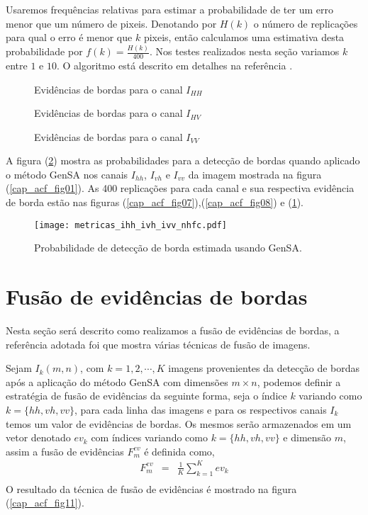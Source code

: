 Usaremos frequências relativas para estimar a probabilidade de ter um erro menor que um número de pixeis. Denotando por $H(k)$ o número de replicações para qual o erro é menor que $k$ pixeis, então calculamos uma estimativa desta probabilidade por $f(k)=\frac{H(k)}{400}$. Nos testes realizados nesta seção variamos $k$ entre $1$ e $10$. O algoritmo está descrito em detalhes na referência \citep{fbgm}. 
\begin{figure}[hbt]
\caption{Evidências de bordas para o canal $I_{HH}$}\label{cap_acf_fig07}
\endminipage\hfill
{}
\caption{Evidências de bordas para o canal $I_{HV}$}\label{cap_acf_fig08}
\endminipage\hfill
\centering
{}
\caption{Evidências de bordas para o canal $I_{VV}$}\label{cap_acf_fig09}
\endminipage\hfill
\end{figure}

	A figura (\ref{cap_acf_fig10}) mostra as probabilidades para a detecção de bordas quando aplicado o método GenSA nos canais $I_{hh}$, $I_{vh}$ e $I_{vv}$ da imagem mostrada na figura (\ref{cap_acf_fig01}). As 400 replicações para cada canal e sua respectiva evidência de borda estão nas figuras (\ref{cap_acf_fig07}),(\ref{cap_acf_fig08}) e (\ref{cap_acf_fig09}).  
\begin{figure}[hbt]
\centering
	\texttt{[image: metricas\_ihh\_ivh\_ivv\_nhfc.pdf]}
	\caption{Probabilidade de detecção de borda estimada usando GenSA.}
\label{cap_acf_fig10}
\end{figure}

\section{Fusão de evidências de bordas}

	Nesta seção será descrito como realizamos a fusão de evidências de bordas, a referência adotada foi \citet{mit} que mostra várias técnicas de fusão de imagens. 

	Sejam $I_k(m,n)$, com $k=1,2,\cdots,K$ imagens provenientes da detecção de bordas após a aplicação do método GenSA com dimensões $m \times n$, podemos definir a estratégia de fusão de evidências da seguinte forma, seja o índice $k$ variando como $k=\{hh,vh,vv\}$, para cada linha das imagens e para os respectivos canais $I_k$ temos um valor de evidências de bordas.  Os mesmos serão armazenados em um vetor denotado $ev_k$ com índices variando como $k=\{hh,vh,vv\}$ e dimensão $m$, assim a fusão de evidências $F_{m}^{ev}$ é definida como,
\begin{equation}\label{cap_acf_27}
\begin{array}{lll}
	F_{m}^{ev} &=&\frac{1}{K}\sum_{k=1}^{K}ev_k  \\
\end{array}
\end{equation}
 O resultado da técnica de fusão de evidências é mostrado na figura (\ref{cap_acf_fig11}).

